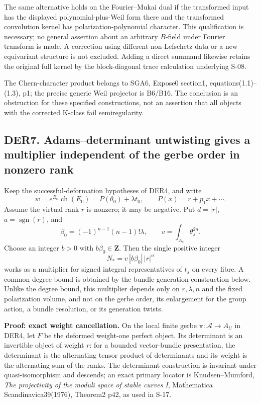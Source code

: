 \documentclass[11pt,a4paper]{article}
\theoremstyle{definition}
\begin{document}
The same alternative holds on the Fourier--Mukai dual if the transformed
input has the displayed polynomial-plus-Weil form there and the
transformed convolution kernel has polarization-polynomial character.
This qualification is necessary; no general assertion about an arbitrary
\(B\)-field under Fourier transform is made. A correction using
different non-Lefschetz data or a new equivariant structure is not
excluded. Adding a direct summand likewise retains the original full
kernel by the block-diagonal trace calculation underlying S-08.

The Chern-character product belongs to SGA6, Expose0 section1,
equations(1.1)--(1.3), p1; the precise generic Weil projector is B6/B16.
The conclusion is an obstruction for these specified constructions, not
an assertion that all objects with the corrected K-class fail
semiregularity.

\subsection{DER7. Adams--determinant untwisting gives a multiplier
independent of the gerbe order in nonzero
rank}\label{der7.-adamsdeterminant-untwisting-gives-a-multiplier-independent-of-the-gerbe-order-in-nonzero-rank}

Keep the successful-deformation hypotheses of DER4, and write \[
 w=e^{B_0}\operatorname{ch}(E_0)=P(\theta_0)+\lambda t_0,
 \qquad P(x)=r+p_1x+\cdots.
\] Assume the virtual rank \(r\) is nonzero; it may be negative. Put
\(d=|r|\), \(a=\operatorname{sgn}(r)\), and \[
 \beta_0=(-1)^{n-1}(n-1)!\lambda,\qquad
 v=\int_{A_s}\theta_s^{2n}.
\] Choose an integer \(b>0\) with \(b\beta_0\in\mathbf Z\). Then the
single positive integer \[
 N_*=v\,|b\beta_0|\,|r|^n
\tag{DER7a}
\] works as a multiplier for signed integral representatives of \(t_s\)
on every fibre. A common degree bound is obtained by the
bundle-generation construction below. Unlike the degree bound, this
multiplier depends only on \(r,\lambda,n\) and the fixed polarization
volume, and not on the gerbe order, its enlargement for the group
action, a bundle resolution, or its generation twists.

\textbf{Proof: exact weight cancellation.} On the local finite gerbe
\(\pi:\mathcal A\to A_U\) in DER4, let \(F\) be the deformed weight-one
perfect object. Its determinant is an invertible object of weight \(r\):
for a bounded vector-bundle presentation, the determinant is the
alternating tensor product of determinants and its weight is the
alternating sum of the ranks. The determinant construction is invariant
under quasi-isomorphism and descends; an exact primary locator is
Knudsen--Mumford, \emph{The projectivity of the moduli space of stable
curves I}, Mathematica Scandinavica39(1976), Theorem2 p42, as used in
S-17.
\end{document}

